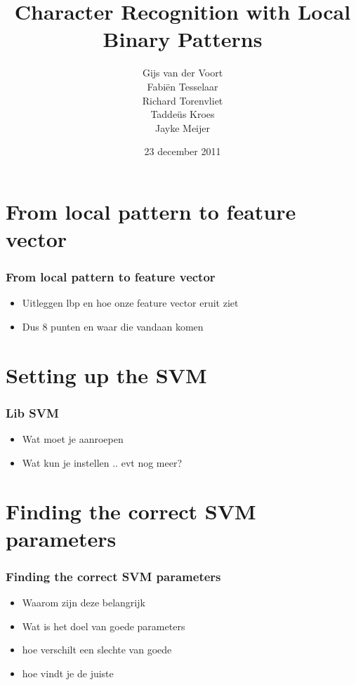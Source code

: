 \documentclass{beamer}
\title{Character Recognition with Local Binary Patterns}
\date{23 december 2011}
\author{
    Gijs van der Voort\\
    Fabi\"en Tesselaar\\
    Richard Torenvliet\\
    Tadde\"us Kroes\\
    Jayke Meijer
}
\begin{document}
    \begin{frame}
        \titlepage
    \end{frame}

    \section{From local pattern to feature vector}

    \begin{frame}
        \frametitle{From local pattern to feature vector}

        \begin{itemize}
        \item Uitleggen lbp en hoe onze feature vector eruit ziet
        \pause
        \item Dus 8 punten en waar die vandaan komen
        \end{itemize}
    \end{frame}

    \section{Setting up the SVM}

    \begin{frame}
        \frametitle{Lib SVM}

        \begin{itemize}
            \item Wat moet je aanroepen
            \pause
            \item Wat kun je instellen .. evt nog meer?
        \end{itemize}
    \end{frame}

    \section{Finding the correct SVM parameters}

    \begin{frame}
        \frametitle{Finding the correct SVM parameters}
        \begin{itemize}
            \item Waarom zijn deze belangrijk
            \pause
            \item Wat is het doel van goede parameters
            \pause
            \item hoe verschilt een slechte van goede
            \pause
            \item hoe vindt je de juiste
        \end{itemize}
    \end{frame}
\end{document}
